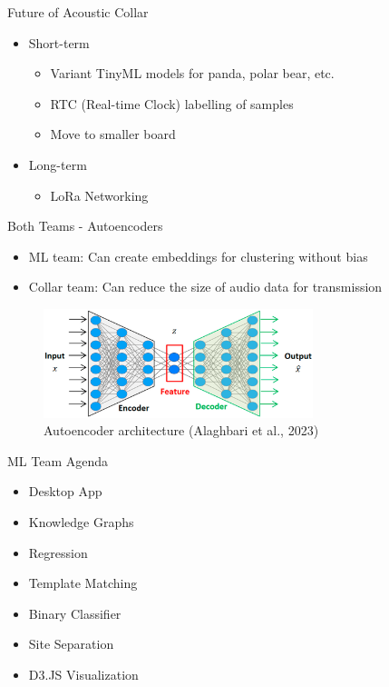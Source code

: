 \begin{frame}{Future of Acoustic Collar}
    \begin{itemize}
        \item Short-term
        \begin{itemize}
            \item Variant TinyML models for panda, polar bear, etc.
            \item RTC (Real-time Clock) labelling of samples
            \item Move to smaller board
        \end{itemize}
        \item Long-term
        \begin{itemize}
            \item LoRa Networking
        \end{itemize}
    \end{itemize}
\end{frame}

\begin{frame}{Both Teams - Autoencoders}
    \begin{itemize}
        \item ML team: Can create embeddings for clustering without bias
        \item Collar team: Can reduce the size of audio data for transmission
    \end{itemize}
    \begin{figure}
        \centering
        \includegraphics[height=0.7\textheight,width=0.7\textwidth,keepaspectratio]{images/autoencoder.png}
        \caption{Autoencoder architecture (Alaghbari et al., 2023)}
    \end{figure}
\end{frame}

\begin{frame}{ML Team Agenda}
    \begin{itemize}
        \item Desktop App
        \item Knowledge Graphs
        \item Regression
        \item Template Matching
        \item Binary Classifier
        \item Site Separation
        \item D3.JS Visualization
    \end{itemize}
\end{frame}

